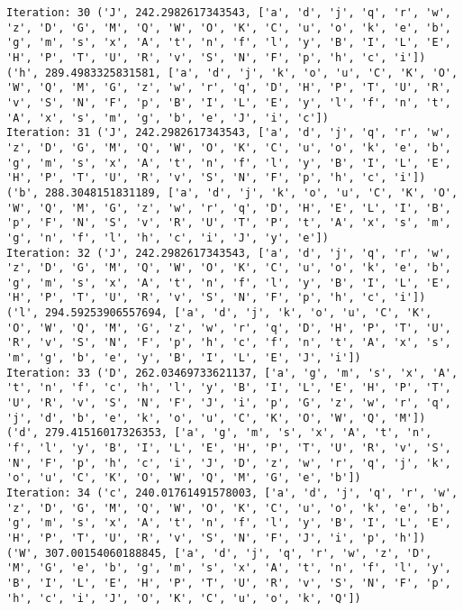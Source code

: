 \documentclass[english,man]{apa6}
\begin{document}
\begin{verbatim}
Iteration: 30 ('J', 242.2982617343543, ['a', 'd', 'j', 'q', 'r', 'w', 'z', 'D', 'G', 'M', 'Q', 'W', 'O', 'K', 'C', 'u', 'o', 'k', 'e', 'b', 'g', 'm', 's', 'x', 'A', 't', 'n', 'f', 'l', 'y', 'B', 'I', 'L', 'E', 'H', 'P', 'T', 'U', 'R', 'v', 'S', 'N', 'F', 'p', 'h', 'c', 'i']) ('h', 289.4983325831581, ['a', 'd', 'j', 'k', 'o', 'u', 'C', 'K', 'O', 'W', 'Q', 'M', 'G', 'z', 'w', 'r', 'q', 'D', 'H', 'P', 'T', 'U', 'R', 'v', 'S', 'N', 'F', 'p', 'B', 'I', 'L', 'E', 'y', 'l', 'f', 'n', 't', 'A', 'x', 's', 'm', 'g', 'b', 'e', 'J', 'i', 'c'])
Iteration: 31 ('J', 242.2982617343543, ['a', 'd', 'j', 'q', 'r', 'w', 'z', 'D', 'G', 'M', 'Q', 'W', 'O', 'K', 'C', 'u', 'o', 'k', 'e', 'b', 'g', 'm', 's', 'x', 'A', 't', 'n', 'f', 'l', 'y', 'B', 'I', 'L', 'E', 'H', 'P', 'T', 'U', 'R', 'v', 'S', 'N', 'F', 'p', 'h', 'c', 'i']) ('b', 288.3048151831189, ['a', 'd', 'j', 'k', 'o', 'u', 'C', 'K', 'O', 'W', 'Q', 'M', 'G', 'z', 'w', 'r', 'q', 'D', 'H', 'E', 'L', 'I', 'B', 'p', 'F', 'N', 'S', 'v', 'R', 'U', 'T', 'P', 't', 'A', 'x', 's', 'm', 'g', 'n', 'f', 'l', 'h', 'c', 'i', 'J', 'y', 'e'])
Iteration: 32 ('J', 242.2982617343543, ['a', 'd', 'j', 'q', 'r', 'w', 'z', 'D', 'G', 'M', 'Q', 'W', 'O', 'K', 'C', 'u', 'o', 'k', 'e', 'b', 'g', 'm', 's', 'x', 'A', 't', 'n', 'f', 'l', 'y', 'B', 'I', 'L', 'E', 'H', 'P', 'T', 'U', 'R', 'v', 'S', 'N', 'F', 'p', 'h', 'c', 'i']) ('l', 294.59253906557694, ['a', 'd', 'j', 'k', 'o', 'u', 'C', 'K', 'O', 'W', 'Q', 'M', 'G', 'z', 'w', 'r', 'q', 'D', 'H', 'P', 'T', 'U', 'R', 'v', 'S', 'N', 'F', 'p', 'h', 'c', 'f', 'n', 't', 'A', 'x', 's', 'm', 'g', 'b', 'e', 'y', 'B', 'I', 'L', 'E', 'J', 'i'])
Iteration: 33 ('D', 262.03469733621137, ['a', 'g', 'm', 's', 'x', 'A', 't', 'n', 'f', 'c', 'h', 'l', 'y', 'B', 'I', 'L', 'E', 'H', 'P', 'T', 'U', 'R', 'v', 'S', 'N', 'F', 'J', 'i', 'p', 'G', 'z', 'w', 'r', 'q', 'j', 'd', 'b', 'e', 'k', 'o', 'u', 'C', 'K', 'O', 'W', 'Q', 'M']) ('d', 279.41516017326353, ['a', 'g', 'm', 's', 'x', 'A', 't', 'n', 'f', 'l', 'y', 'B', 'I', 'L', 'E', 'H', 'P', 'T', 'U', 'R', 'v', 'S', 'N', 'F', 'p', 'h', 'c', 'i', 'J', 'D', 'z', 'w', 'r', 'q', 'j', 'k', 'o', 'u', 'C', 'K', 'O', 'W', 'Q', 'M', 'G', 'e', 'b'])
Iteration: 34 ('c', 240.01761491578003, ['a', 'd', 'j', 'q', 'r', 'w', 'z', 'D', 'G', 'M', 'Q', 'W', 'O', 'K', 'C', 'u', 'o', 'k', 'e', 'b', 'g', 'm', 's', 'x', 'A', 't', 'n', 'f', 'l', 'y', 'B', 'I', 'L', 'E', 'H', 'P', 'T', 'U', 'R', 'v', 'S', 'N', 'F', 'J', 'i', 'p', 'h']) ('W', 307.00154060188845, ['a', 'd', 'j', 'q', 'r', 'w', 'z', 'D', 'M', 'G', 'e', 'b', 'g', 'm', 's', 'x', 'A', 't', 'n', 'f', 'l', 'y', 'B', 'I', 'L', 'E', 'H', 'P', 'T', 'U', 'R', 'v', 'S', 'N', 'F', 'p', 'h', 'c', 'i', 'J', 'O', 'K', 'C', 'u', 'o', 'k', 'Q'])

\end{verbatim}
\end{document}
